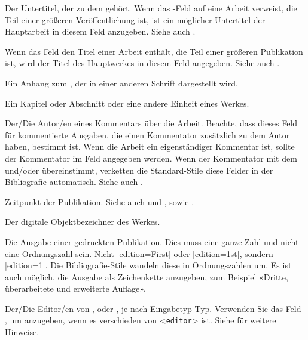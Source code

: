 \documentclass{ltxdockit}[2011/03/25]
\begin{document}
\begin{fieldlist}

Der Untertitel, der zu dem  gehört. Wenn das
-Feld auf eine Arbeit verweist, die Teil einer größeren
Veröffentlichung ist, ist ein möglicher Untertitel der Hauptarbeit in diesem
Feld anzugeben. Siehe auch .


Wenn das Feld  den Titel einer Arbeit enthält, die Teil einer
größeren Publikation ist, wird der Titel des Hauptwerkes in diesem Feld
angegeben. Siehe auch .


Ein Anhang zum , der in einer anderen Schrift dargestellt
wird.


Ein Kapitel oder Abschnitt oder eine andere Einheit eines Werkes.


Der/Die Autor/en eines Kommentars über die Arbeit. Beachte, dass dieses Feld für
kommentierte Ausgaben, die einen Kommentator zusätzlich zu dem Autor haben,
bestimmt ist. Wenn die Arbeit ein eigenständiger Kommentar ist, sollte der
Kommentator im Feld  angegeben werden. Wenn der Kommentator mit
dem  und\slash oder  übereinstimmt,
verketten die Standard-Stile diese Felder in der Bibliografie automatisch.
Siehe auch .


Zeitpunkt der Publikation. Siehe auch  und ,
sowie .


Der digitale Objektbezeichner des Werkes.


Die Ausgabe einer gedruckten Publikation. Dies muss eine ganze Zahl und nicht
eine Ordnungszahl sein. Nicht |edition={First}| oder |edition={1st}|, sondern
|edition={1}|. Die Bibliografie-Stile wandeln diese in Ordnungszahlen um. Es
ist auch möglich, die Ausgabe als Zeichenkette anzugeben, zum Beispiel «Dritte,
überarbeitete und erweiterte Auflage».


Der/Die Editor/en von ,  oder
, je nach Eingabetyp Typ. Verwenden Sie das Feld
, um anzugeben, wenn es verschieden von <\texttt{editor}>
ist. Siehe  für weitere Hinweise.


\end{fieldlist}
\end{document}
